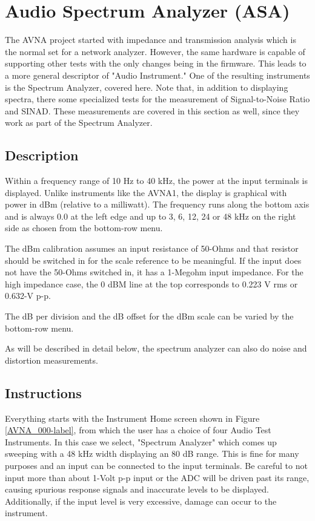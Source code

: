 \section{Audio Spectrum Analyzer (ASA)}
\label{sect:ASA}
The AVNA project started with impedance and transmission analysis which is the normal set for a network analyzer.  However, the same hardware is capable of supporting other tests with the only changes being in the firmware.  This leads to a more general descriptor of "Audio Instrument."  One of the resulting instruments is the Spectrum Analyzer, covered here.  Note that, in addition to displaying spectra,  there some specialized tests for the measurement of Signal-to-Noise Ratio and SINAD.  These measurements are covered in this section as well, since they work as part of the Spectrum Analyzer.
\subsection{Description}
\label{subsect:ASADescr}
Within a frequency range of 10 Hz to 40 kHz, the power at the  input terminals is displayed.  Unlike instruments like the AVNA1, the display is graphical with power in dBm (relative to a milliwatt).  The frequency runs along the bottom axis and is always 0.0 at the left edge and up to 3, 6, 12, 24 or 48 kHz on the right side as chosen from the bottom-row menu.

The dBm calibration assumes an input resistance of 50-Ohms and that resistor should be switched in for the scale reference to be meaningful.  If the input does not have the 50-Ohms switched in, it has a 1-Megohm input impedance.  For the high impedance case, the 0 dBM line at the top corresponds to 0.223 V rms or 0.632-V p-p.

The dB per division and the dB offset for the dBm scale can be varied by the bottom-row menu.

As will be described in detail below, the spectrum analyzer can also do noise and  distortion measurements.

\subsection{Instructions}
\label{subsect:ASAInstr}
Everything starts with the Instrument Home screen shown in  Figure \ref{AVNA_000-label},  from which the user has a choice of four Audio Test Instruments. In this case we select, "\textsf{Spectrum Analyzer}"  which comes up sweeping with a 48 kHz width displaying an 80 dB range.   This is fine for many purposes and an input can be connected to the  input terminals.  Be careful to not input more than about 1-Volt p-p input or the ADC will be driven past its range, causing spurious response signals and inaccurate levels to be displayed.  Additionally, if the input level is very excessive,  damage can occur to the instrument.

